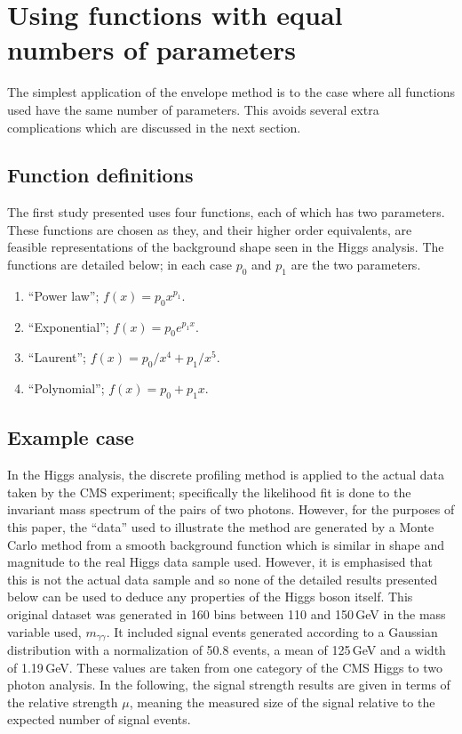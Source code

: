 \section{Using functions with equal numbers of parameters} %
\label{sec:functions}

The simplest application of the envelope method is to the case where all
functions used have the same number of parameters. This avoids several extra
complications which are discussed in the next section.

\subsection{Function definitions}
\label{sec:functions:function}

The first study presented uses four functions, each of which has two parameters.
These functions are chosen as they, and their higher order equivalents,
are feasible representations of the background shape seen in the Higgs
analysis. The functions are detailed below; in each case $p_0$ and $p_1$ are
the two parameters.
\begin{enumerate}
\item
``Power law''; $f(x) = p_0 x^{p_1}$.
\item
``Exponential''; $f(x) = p_0 e^{p_1x}$.
\item
``Laurent''; $f(x) = p_0/x^4 + p_1/x^5$.
\item
``Polynomial''; $f(x) = p_0 + p_1 x$.
\end{enumerate}

\subsection{Example case}
\label{sec:functions:example}

In the Higgs analysis, the discrete profiling method is applied to
the actual data taken by the CMS experiment; specifically the likelihood fit
is done to the invariant mass spectrum of the pairs of two photons.
However, for the purposes of this
paper, the ``data'' used to illustrate the method are generated by a Monte Carlo
method from a smooth background
function which is similar in shape and magnitude to the
real Higgs data sample used. However, it is emphasised that this is not the 
actual data sample and so 
none of the detailed results presented below can be used to deduce any
properties of the Higgs boson itself.
This original dataset was generated in 160 bins between 110 and 150\,GeV in
the mass variable used, $m_{\gamma\gamma}$.
It included signal events
generated according to a Gaussian distribution with a normalization of 50.8 events, a mean of 125\,GeV and a 
width of 1.19\,GeV. These values are taken from one category of the CMS Higgs to two photon analysis.
In the following, the signal strength results are given in
terms of the relative strength $\mu$, 
meaning the measured size of the signal relative
to the expected number of signal events. 

